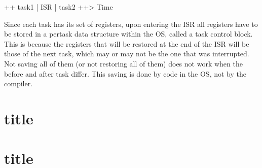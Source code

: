 ++ task1 | ISR | task2 ++> Time


Since each task has its set of registers, upon entering the ISR all registers have to be stored in a per­task data structure within the OS, called a task control block. This is because the registers that will be restored at the end of the ISR will be those of the next task, which may or may not be the one that was interrupted. Not saving all of them (or not restoring all of them) does not work when the before and after task differ. This saving is done by code in the OS, not by the compiler.

\section{title}
\section{title}
